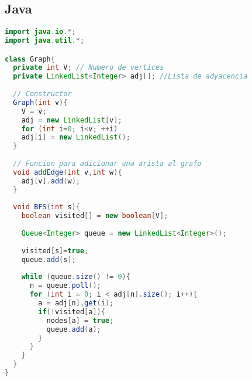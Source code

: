 \subsection{Java}

\begin{lstlisting}[language=Java]
import java.io.*;
import java.util.*;

class Graph{
  private int V; // Numero de vertices
  private LinkedList<Integer> adj[]; //Lista de adyacencia
	
  // Constructor
  Graph(int v){
    V = v;
    adj = new LinkedList[v];
    for (int i=0; i<v; ++i)
    adj[i] = new LinkedList();
  }
	
  // Funcion para adicionar una arista al grafo
  void addEdge(int v,int w){
    adj[v].add(w);
  }
	
  void BFS(int s){
    boolean visited[] = new boolean[V];
		
    Queue<Integer> queue = new LinkedList<Integer>();
		
    visited[s]=true;
    queue.add(s);
		
    while (queue.size() != 0){
	  n = queue.poll();
	  for (int i = 0; i < adj[n].size(); i++){
	  	a = adj[n].get(i);
	  	if(!visited[a]){
          nodes[a] = true;
          queue.add(a);
        }
	  }  
	}
  }
}
\end{lstlisting} 

